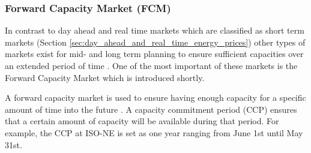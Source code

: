 %








\subsubsection{Forward Capacity Market (FCM)} 

In contrast to day ahead and real time markets which are classified as short term markets (Section \ref{sec:day_ahead_and_real_time_energy_prices}) other types of markets exist for mid- and long term planning to ensure sufficient capacities over an extended period of time \cite{barroso2005classification,nomikos2010modelling}. One of the most important of these markets is the Forward Capacity Market which is introduced shortly. 

A forward capacity market is used to ensure having enough capacity for a specific amount of time into the future \cite{gottstein2010role}. A capacity commitment period (CCP) ensures that a certain amount of capacity will be available during that period. For example, the CCP at ISO-NE is set as one year ranging from June 1st until May 31st. 

